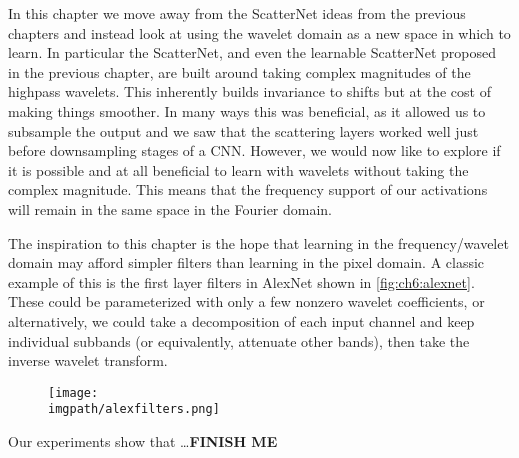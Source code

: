 In this chapter we move away from the ScatterNet ideas from the previous 
chapters and instead look at using the wavelet domain as a new space in which to
learn. In particular the ScatterNet, and even the learnable ScatterNet proposed
in the previous chapter, are built around taking complex magnitudes of the
highpass wavelets. This inherently builds invariance to shifts but at the cost
of making things smoother. In many ways this was beneficial, as it allowed us to
subsample the output and we saw that the scattering layers worked well just 
before downsampling stages of a CNN\@. However, we would now like to explore
if it is possible and at all beneficial to learn with wavelets without taking
the complex magnitude. This means that the frequency support of our activations
will remain in the same space in the Fourier domain. 

The inspiration to this chapter is the hope that learning in the
frequency/wavelet domain may afford simpler filters than learning in the pixel
domain. A classic example of this is the first layer filters in AlexNet shown in
\autoref{fig:ch6:alexnet}. These could be parameterized with only a few nonzero
wavelet coefficients, or alternatively, we could take a 
decomposition of each input channel and keep individual
subbands (or equivalently, attenuate other bands), then take the inverse wavelet
transform. 

\begin{figure}[bt]
  \centering
  \texttt{[image: \\imgpath/alexfilters.png]}
  \label{fig:ch6:alexnet}
\end{figure}

Our experiments show that \ldots \textbf{FINISH ME}


